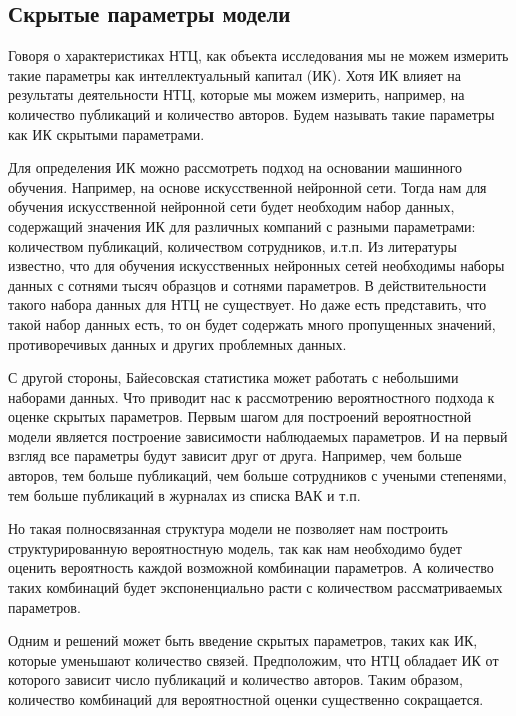 \subsection{Скрытые параметры модели}
Говоря о характеристиках НТЦ, как объекта исследования мы не можем измерить такие параметры как интеллектуальный капитал (ИК).
Хотя ИК влияет на результаты деятельности НТЦ, которые мы можем измерить, например, на  количество публикаций и количество авторов.
Будем называть такие параметры как ИК скрытыми параметрами.

Для определения ИК можно рассмотреть подход на основании машинного обучения. 
Например, на основе искусственной нейронной сети. 
Тогда нам для обучения искусственной нейронной сети будет необходим набор данных, содержащий значения ИК для различных компаний с разными параметрами: количеством публикаций, количеством сотрудников, и.т.п.
Из литературы известно, что для обучения искусственных  нейронных сетей необходимы наборы данных с сотнями тысяч образцов и сотнями параметров.  
В действительности такого набора данных для НТЦ не существует. 
Но даже есть представить, что такой набор данных есть, то он будет содержать много пропущенных значений, противоречивых данных и других проблемных данных.

С другой стороны, Байесовская статистика может работать с небольшими наборами данных. 
Что приводит нас к рассмотрению вероятностного подхода к оценке скрытых параметров. 
Первым шагом для построений вероятностной модели является построение зависимости наблюдаемых параметров. И на первый взгляд все параметры будут зависит друг от друга. 
Например, чем больше авторов, тем больше публикаций, чем больше сотрудников с учеными степенями, тем больше публикаций в журналах из списка ВАК и т.п. 


Но такая полносвязанная структура модели не позволяет нам построить структурированную вероятностную модель, так как нам необходимо будет оценить вероятность каждой возможной комбинации параметров.
А количество таких комбинаций будет экспоненциально расти с количеством рассматриваемых параметров.  


Одним и решений может быть введение скрытых параметров, таких как ИК, которые уменьшают количество связей. 
Предположим, что НТЦ обладает ИК от которого зависит число публикаций и количество авторов. 
Таким образом, количество комбинаций для вероятностной оценки существенно сокращается.


